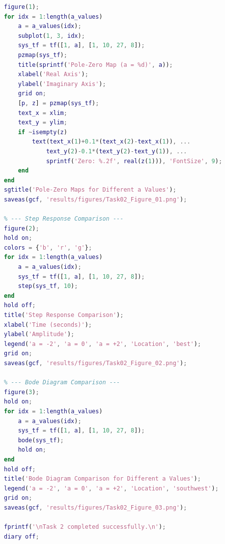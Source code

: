 \documentclass{../common/SCNU_Experimental_Report}
\begin{document}
\begin{lstlisting}[language=Matlab]
% --- Pole-Zero Maps ---
figure(1);
for idx = 1:length(a_values)
    a = a_values(idx);
    subplot(1, 3, idx);
    sys_tf = tf([1, a], [1, 10, 27, 8]);
    pzmap(sys_tf);
    title(sprintf('Pole-Zero Map (a = %d)', a));
    xlabel('Real Axis');
    ylabel('Imaginary Axis');
    grid on;
    [p, z] = pzmap(sys_tf);
    text_x = xlim;
    text_y = ylim;
    if ~isempty(z)
        text(text_x(1)+0.1*(text_x(2)-text_x(1)), ...
            text_y(2)-0.1*(text_y(2)-text_y(1)), ...
            sprintf('Zero: %.2f', real(z(1))), 'FontSize', 9);
    end
end
sgtitle('Pole-Zero Maps for Different a Values');
saveas(gcf, 'results/figures/Task02_Figure_01.png');

% --- Step Response Comparison ---
figure(2);
hold on;
colors = {'b', 'r', 'g'};
for idx = 1:length(a_values)
    a = a_values(idx);
    sys_tf = tf([1, a], [1, 10, 27, 8]);
    step(sys_tf, 10);
end
hold off;
title('Step Response Comparison');
xlabel('Time (seconds)');
ylabel('Amplitude');
legend('a = -2', 'a = 0', 'a = +2', 'Location', 'best');
grid on;
saveas(gcf, 'results/figures/Task02_Figure_02.png');

% --- Bode Diagram Comparison ---
figure(3);
hold on;
for idx = 1:length(a_values)
    a = a_values(idx);
    sys_tf = tf([1, a], [1, 10, 27, 8]);
    bode(sys_tf);
    hold on;
end
hold off;
title('Bode Diagram Comparison for Different a Values');
legend('a = -2', 'a = 0', 'a = +2', 'Location', 'southwest');
grid on;
saveas(gcf, 'results/figures/Task02_Figure_03.png');

fprintf('\nTask 2 completed successfully.\n');
diary off;
\end{lstlisting}
\end{document}
